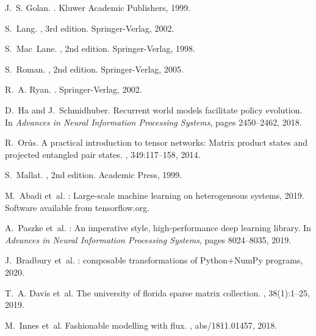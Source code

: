 \documentclass[sigconf,review]{acmart}
\begin{document}

\begin{thebibliography}{10}

J.~S. Golan.
.
\newblock Kluwer Academic Publishers, 1999.

S.~Lang.
, 3rd edition.
\newblock Springer-Verlag, 2002.

S.~Mac~Lane.
, 2nd edition.
\newblock Springer-Verlag, 1998.

S.~Roman.
, 2nd edition.
\newblock Springer-Verlag, 2005.

R.~A. Ryan.
.
\newblock Springer-Verlag, 2002.

D.~Ha and J.~Schmidhuber.
\newblock Recurrent world models facilitate policy evolution.
\newblock In {\em Advances in Neural Information Processing Systems}, pages 2450--2462, 2018.

R.~Or{\'u}s.
\newblock A practical introduction to tensor networks: Matrix product states and projected entangled pair states.
, 349:117--158, 2014.

S.~Mallat.
, 2nd edition.
\newblock Academic Press, 1999.

M.~Abadi et~al.
: Large-scale machine learning on heterogeneous systems, 2019.
\newblock Software available from tensorflow.org.

A.~Paszke et~al.
: An imperative style, high-performance deep learning library.
\newblock In {\em Advances in Neural Information Processing Systems}, pages 8024--8035, 2019.

J.~Bradbury et~al.
: composable transformations of {Python+NumPy} programs, 2020.

T.~A. Davis et~al.
\newblock The university of florida sparse matrix collection.
, 38(1):1--25, 2019.

M.~Innes et~al.
\newblock Fashionable modelling with flux.
, abs/1811.01457, 2018.

\end{thebibliography}
\end{document}
